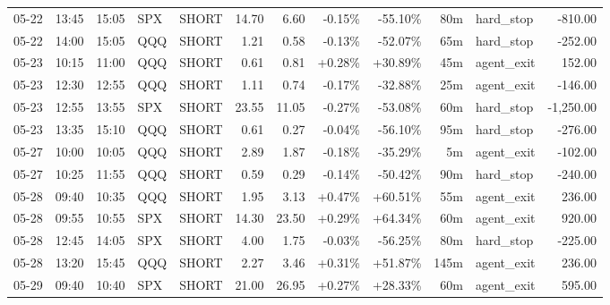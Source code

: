 \documentclass[11pt,a4paper,twoside]{article}
\begin{document}
\begin{center}
\begin{longtable}{>{\color{txtmain}}l l l l l r r r r r >{\color{txtmain}}l r}
05-22 & 13:45 & 15:05 & SPX & SHORT & 14.70 & 6.60 & \textcolor{lossred}{-0.15\%} & \textcolor{lossred}{-55.10\%} & 80m & hard\_stop & \textcolor{lossred}{-810.00} \\
05-22 & 14:00 & 15:05 & QQQ & SHORT & 1.21 & 0.58 & \textcolor{lossred}{-0.13\%} & \textcolor{lossred}{-52.07\%} & 65m & hard\_stop & \textcolor{lossred}{-252.00} \\
05-23 & 10:15 & 11:00 & QQQ & SHORT & 0.61 & 0.81 & \textcolor{wingreen}{+0.28\%} & \textcolor{wingreen}{+30.89\%} & 45m & agent\_exit & \textcolor{wingreen}{152.00} \\
05-23 & 12:30 & 12:55 & QQQ & SHORT & 1.11 & 0.74 & \textcolor{lossred}{-0.17\%} & \textcolor{lossred}{-32.88\%} & 25m & agent\_exit & \textcolor{lossred}{-146.00} \\
05-23 & 12:55 & 13:55 & SPX & SHORT & 23.55 & 11.05 & \textcolor{lossred}{-0.27\%} & \textcolor{lossred}{-53.08\%} & 60m & hard\_stop & \textcolor{lossred}{-1,250.00} \\
05-23 & 13:35 & 15:10 & QQQ & SHORT & 0.61 & 0.27 & \textcolor{lossred}{-0.04\%} & \textcolor{lossred}{-56.10\%} & 95m & hard\_stop & \textcolor{lossred}{-276.00} \\
05-27 & 10:00 & 10:05 & QQQ & SHORT & 2.89 & 1.87 & \textcolor{lossred}{-0.18\%} & \textcolor{lossred}{-35.29\%} & 5m & agent\_exit & \textcolor{lossred}{-102.00} \\
05-27 & 10:25 & 11:55 & QQQ & SHORT & 0.59 & 0.29 & \textcolor{lossred}{-0.14\%} & \textcolor{lossred}{-50.42\%} & 90m & hard\_stop & \textcolor{lossred}{-240.00} \\
05-28 & 09:40 & 10:35 & QQQ & SHORT & 1.95 & 3.13 & \textcolor{wingreen}{+0.47\%} & \textcolor{wingreen}{+60.51\%} & 55m & agent\_exit & \textcolor{wingreen}{236.00} \\
05-28 & 09:55 & 10:55 & SPX & SHORT & 14.30 & 23.50 & \textcolor{wingreen}{+0.29\%} & \textcolor{wingreen}{+64.34\%} & 60m & agent\_exit & \textcolor{wingreen}{920.00} \\
05-28 & 12:45 & 14:05 & SPX & SHORT & 4.00 & 1.75 & \textcolor{lossred}{-0.03\%} & \textcolor{lossred}{-56.25\%} & 80m & hard\_stop & \textcolor{lossred}{-225.00} \\
05-28 & 13:20 & 15:45 & QQQ & SHORT & 2.27 & 3.46 & \textcolor{wingreen}{+0.31\%} & \textcolor{wingreen}{+51.87\%} & 145m & agent\_exit & \textcolor{wingreen}{236.00} \\
05-29 & 09:40 & 10:40 & SPX & SHORT & 21.00 & 26.95 & \textcolor{wingreen}{+0.27\%} & \textcolor{wingreen}{+28.33\%} & 60m & agent\_exit & \textcolor{wingreen}{595.00} \\

\end{longtable}
\end{center}
\end{document}
